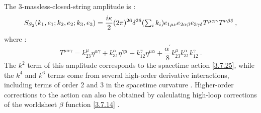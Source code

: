 The 3-massless-closed-string amplitude is :
\begin{equation}
	S_{S_{2}}(k_{1}, e_{1} ; k_{2}, e_{2} ; k_{3}, e_{3})=\frac{i \kappa}{2}(2 \pi)^{26} 
	\delta^{26}(\textstyle{\sum_{i} k_{i}}) e_{1 \mu \nu} e_{2 \alpha \beta} e_{3 \gamma \delta} T^{\mu \alpha \gamma} T^{\nu \beta \delta} \:, \label{6.6.19}
\end{equation}
where :
\begin{equation}
	T^{\mu \alpha \gamma}=k_{23}^{\mu} \eta^{\alpha \gamma}+k_{31}^{\alpha} \eta^{\gamma \mu}+k_{12}^{\gamma} \eta^{\mu \alpha}+\frac{\alpha^{\prime}}{8} k_{23}^{\mu} k_{31}^{\alpha} k_{12}^{\gamma} \:. \label{6.6.20}
\end{equation}
The $k^2$ term of this amplitude corresponds to the spacetime action \eqref{3.7.25}, while the $k^4$ and $k^6$ terms come from several high-order derivative interactions, including terms of order 2 and 3 in the spacetime curvature . Higher-order corrections to the action can also be obtained by calculating high-loop corrections of the worldsheet $\beta$ function \eqref{3.7.14} .

